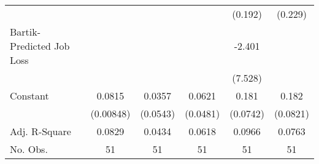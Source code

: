 {\begin{tabular}{l*{5}{c}}
            &                     &                     &                     &     (0.192)         &     (0.229)         \\
Bartik-Predicted Job Loss&                     &                     &                     &      -2.401         &                     \\
            &                     &                     &                     &     (7.528)         &                     \\
Constant    &      0.0815\sym{***}&      0.0357         &      0.0621         &       0.181\sym{**} &       0.182\sym{**} \\
            &   (0.00848)         &    (0.0543)         &    (0.0481)         &    (0.0742)         &    (0.0821)         \\
\hline
Adj. R-Square&      0.0829         &      0.0434         &      0.0618         &      0.0966         &      0.0763         \\
No. Obs.    &          51         &          51         &          51         &          51         &          51         \\
\hline\hline
\end{tabular}
}
